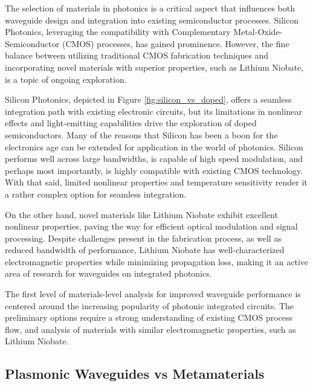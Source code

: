 \documentclass[10pt]{article}
\begin{document}
The selection of materials in photonics is a critical aspect that influences both waveguide design and integration into existing semiconductor processes. 
Silicon Photonics, leveraging the compatibility with Complementary Metal-Oxide-Semiconductor (CMOS) processes, has gained prominence. However, the fine balance between utilizing traditional CMOS fabrication techniques and incorporating novel materials with superior properties, such as Lithium Niobate, is a topic of ongoing exploration.

Silicon Photonics, depicted in Figure \ref{fig:silicon_vs_doped}, offers a seamless integration path with existing electronic circuits, but its limitations in nonlinear effects and light-emitting capabilities drive the exploration of doped semiconductors. Many of the 
reasons that Silicon has been a boon for the electronics age can be extended for application in the world of photonics. Silicon performs well across large bandwidths, is capable of high speed modulation, and perhaps most importantly, is highly compatible with existing CMOS technology.
With that said, limited nonlinear properties and temperature sensitivity render it a rather complex option for seamless integration.

On the other hand, novel materials like Lithium Niobate exhibit excellent nonlinear properties, paving the way for efficient optical modulation and signal processing. Despite 
challenges present in the fabrication process, as well as reduced bandwidth of performance, Lithium Niobate has well-characterized electromagnetic properties while minimizing propagation loss, 
making it an active area of research for waveguides on integrated photonics.


The first level of materials-level analysis for improved waveguide performance is centered around the increasing popularity of photonic integrated circuits. 
The preliminary options require a strong understanding of existing CMOS process flow, and analysis of materials with similar electromagnetic properties, such as Lithium Niobate.

\subsection{Plasmonic Waveguides vs Metamaterials}
\end{document}

